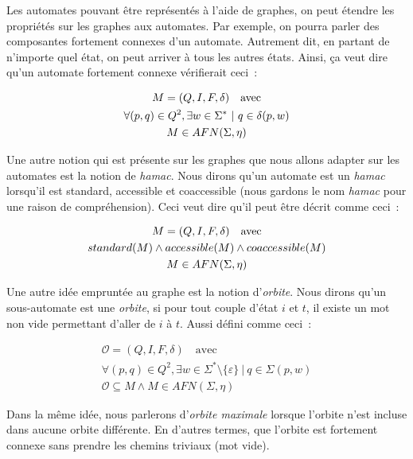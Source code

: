 Les automates pouvant être représentés à l'aide de graphes, on peut étendre les
propriétés sur les graphes aux automates. Par exemple, on pourra parler des
composantes fortement connexes d'un automate. Autrement dit, en partant de
n'importe quel état, on peut arriver à tous les autres états. Ainsi, ça veut
dire qu'un automate fortement connexe vérifierait ceci~:

\begin{gather*}
    M = (Q, I, F, \delta) \quad \text{avec} \\
    \forall (p, q) \in Q^2, \exists w \in \Sigma^* ~|~ q \in \delta(p, w) \notag \\
    M \in AFN(\Sigma, \eta) \notag
\end{gather*}

\begin{definition}
    Une autre notion qui est présente sur les graphes que nous allons adapter
    sur les automates est la notion de \textit{hamac}. Nous dirons qu'un
    automate est un \textit{hamac} lorsqu'il est standard, accessible et
    coaccessible (nous gardons le nom \textit{hamac} pour une raison de
    compréhension). Ceci veut dire qu'il peut être décrit comme ceci~:

    \begin{gather*}
        M = (Q, I, F, \delta) \quad \text{avec} \\
        standard(M) \land accessible(M) \land coaccessible(M) \\
        M \in AFN(\Sigma, \eta) \notag
    \end{gather*}
\end{definition}

\begin{definition}
    Une autre idée empruntée au graphe est la notion d'\textit{orbite}. Nous
    dirons qu'un sous-automate est une \textit{orbite}, si pour tout couple
    d'état \(i\) et \(t\), il existe un mot non vide permettant d'aller de
    \(i\) à \(t\). Aussi défini comme ceci~:

    \begin{gather*}
        \mathcal{O} = (Q, I, F, \delta) \quad \text{avec} \\
        \forall (p, q) \in Q^2, \exists w \in \Sigma^* \setminus \{\varepsilon\} ~|~ q \in \Sigma(p, w) \\
        \mathcal{O} \subseteq M \land M \in AFN(\Sigma, \eta)
    \end{gather*}

    \noindent Dans la même idée, nous parlerons d'\textit{orbite maximale}
    lorsque l'orbite n'est incluse dans aucune orbite différente. En d'autres
    termes, que l'orbite est fortement connexe sans prendre les chemins
    triviaux
    (mot vide).
\end{definition}

